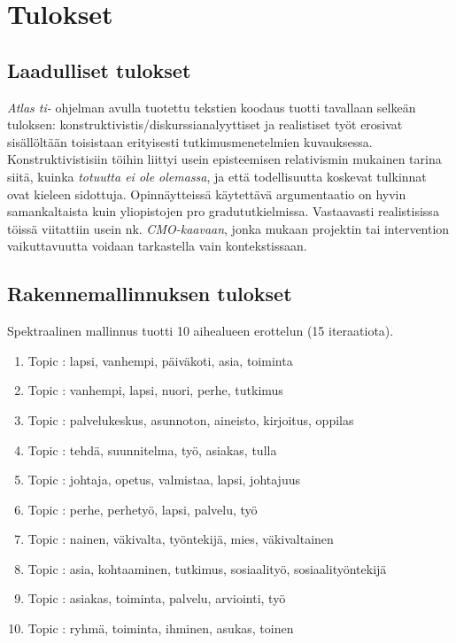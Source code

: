 \section*{Tulokset}

\subsection*{Laadulliset tulokset}

\emph{Atlas ti-} ohjelman avulla tuotettu tekstien koodaus tuotti
tavallaan selkeän tuloksen: konstruktivistis/diskurssianalyyttiset ja
realistiset työt erosivat sisällöltään toisistaan erityisesti
tutkimusmenetelmien kuvauksessa. Konstruktivistisiin töihin liittyi
usein episteemisen relativismin mukainen tarina siitä, kuinka
\emph{totuutta ei ole olemassa}, ja että todellisuutta koskevat
tulkinnat ovat kieleen sidottuja. Opinnäytteissä käytettävä
argumentaatio on hyvin samankaltaista kuin yliopistojen pro
gradututkielmissa. Vastaavasti realistisissa töissä viitattiin usein nk.
\emph{CMO-kaavaan}, jonka mukaan projektin tai intervention
vaikuttavuutta voidaan tarkastella vain kontekstissaan.

\subsection*{Rakennemallinnuksen tulokset}

Spektraalinen mallinnus tuotti 10 aihealueen erottelun (15 iteraatiota).

\begin{enumerate}

\item Topic : lapsi, vanhempi, päiväkoti, asia, toiminta 
\item Topic : vanhempi, lapsi, nuori, perhe, tutkimus 
\item Topic : palvelukeskus, asunnoton, aineisto, kirjoitus, oppilas 
\item Topic : tehdä, suunnitelma, työ, asiakas, tulla  
\item Topic : johtaja, opetus, valmistaa, lapsi, johtajuus 
\item Topic : perhe, perhetyö, lapsi, palvelu, työ 
\item Topic : nainen, väkivalta, työntekijä, mies, väkivaltainen 
\item Topic : asia, kohtaaminen, tutkimus, sosiaalityö, sosiaalityöntekijä  
\item Topic : asiakas, toiminta, palvelu, arviointi, työ 
\item Topic : ryhmä, toiminta, ihminen, asukas, toinen

\end{enumerate}


